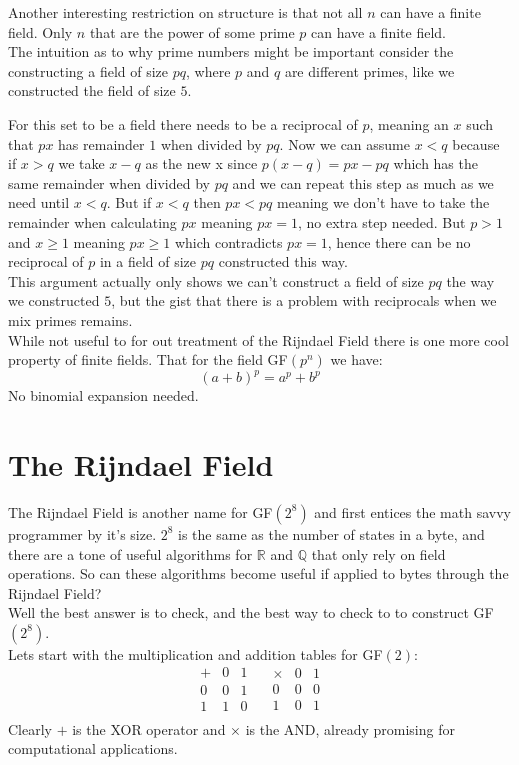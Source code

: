 Another interesting restriction on structure is that not all $n$ can have a finite field.
Only $n$ that are the power of some prime $p$ can have a finite field.
\\

The intuition as to why prime numbers might be important consider the constructing a field of size $pq$, where $p$ and $q$ are different primes, like we constructed the field of size $5$.

For this set to be a field there needs to be a reciprocal of $p$, meaning an $x$ such that $px$ has remainder $1$ when divided by $pq$. 
Now we can assume $x < q$ because if $x>q$ we take $x-q$ as the new x since $p(x-q) = px-pq$ which has the same remainder when divided by $pq$ and we can repeat this step as much as we need until $x < q$.
But if $x <q$ then $px < pq$ meaning we don't have to take the remainder when calculating $px$ meaning $px = 1$, no extra step needed.
But $p>1$ and $x\geq 1$ meaning $px \geq 1$ which contradicts $px = 1$, 
hence there can be no reciprocal of $p$ in a field of size $pq$ constructed this way.
\\

This argument actually only shows we can't construct a field of size $pq$ the way we constructed $5$,
but the gist that there is a problem with reciprocals when we mix primes remains.
\\

While not useful to for out treatment of the Rijndael Field there is one more cool property of finite fields.
That for the field GF$(p^n)$ we have:
\[(a+b)^p = a^p+b^p\]
No binomial expansion needed.
\section{The Rijndael Field}
The Rijndael Field is another name for GF$(2^8)$ and first entices the math savvy programmer by it's size.
$2^8$ is the same as the number of states in a byte,
and there are a tone of useful algorithms for $\mathbb{R}$ and $\mathbb{Q}$ that only rely on field operations.
So can these algorithms become useful if applied to bytes through the Rijndael Field?
\\

Well the best answer is to check,
and the best way to check to to construct GF$(2^8)$.
\\

Lets start with the multiplication and addition tables for GF$(2)$:
\[
\begin{array}{c|cc}
	+& 0 & 1 \\
	\hline 
	0&0&1\\
	1&1&0\\
\end{array}
\quad
\begin{array}{c|ccccc}
	\times & 0 & 1 \\
	\hline 
	0&0&0\\
	1&0&1\\
\end{array}
\]
Clearly $+$ is the XOR operator and $\times$ is the AND, already promising for computational applications.
\\

